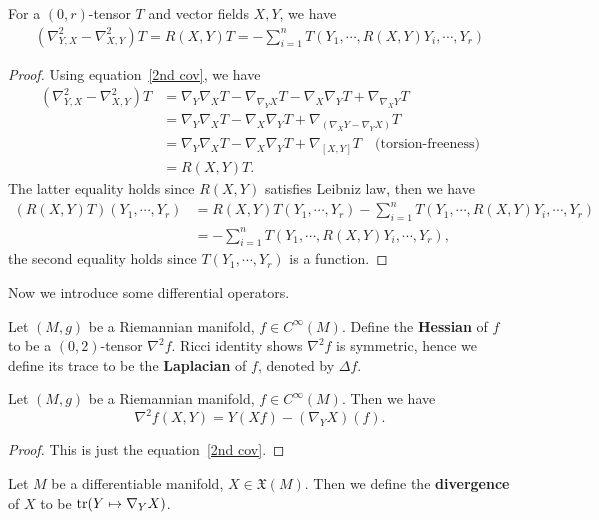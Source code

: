 \begin{prop}\label{Ricci identity}
    For a $(0,r)$-tensor $T$ and vector fields $X,Y$, we have
    \begin{align*}
        (\nabla^2_{Y,X}-\nabla^2_{X,Y})T=R(X,Y)T=-\sum_{i=1}^nT(Y_1,\cdots,R(X,Y)Y_i,\cdots,Y_r)
    \end{align*}
\end{prop}
\begin{proof}
    Using equation~\ref{2nd cov}, we have
    \begin{align*}
        (\nabla^2_{Y,X}-\nabla^2_{X,Y})T&=\nabla_Y\nabla_XT-\nabla_{\nabla_YX}T-\nabla_X\nabla_YT+\nabla_{\nabla_XY}T\\
        &=\nabla_Y\nabla_XT-\nabla_X\nabla_YT+\nabla_{(\nabla_XY-\nabla_YX)}T\\
        &=\nabla_Y\nabla_XT-\nabla_X\nabla_YT+\nabla_{[X,Y]}T\quad\text{(torsion-freeness)}\\
        &=R(X,Y)T.
    \end{align*}
    The latter equality holds since $R(X,Y)$ satisfies Leibniz law, then we have
    \begin{align*}
        (R(X,Y)T)(Y_1,\cdots,Y_r)&=R(X,Y)T(Y_1,\cdots,Y_r)-\sum_{i=1}^nT(Y_1,\cdots,R(X,Y)Y_i,\cdots,Y_r)\\
        &=-\sum_{i=1}^nT(Y_1,\cdots,R(X,Y)Y_i,\cdots,Y_r),
    \end{align*}
    the second equality holds since $T(Y_1,\cdots,Y_r)$ is a function.
\end{proof}

Now we introduce some differential operators.

\begin{defn}
    Let $(M,g)$ be a Riemannian manifold, $f\in C^\infty(M)$.
    Define the \textbf{Hessian} of $f$ to be a $(0,2)$-tensor $\nabla^2f$.
    Ricci identity shows $\nabla^2f$ is symmetric, hence we define its trace to be the \textbf{Laplacian} of $f$, denoted by $\Delta f$.
\end{defn}

\begin{prop}
    Let $(M,g)$ be a Riemannian manifold, $f\in C^\infty(M)$.
    Then we have
    \[\nabla^2f(X,Y)=Y(Xf)-(\nabla_YX)(f).\]
\end{prop}
\begin{proof}
    This is just the equation~\ref{2nd cov}.
\end{proof}

\begin{defn}
    Let $M$ be a differentiable manifold, $X\in\mathfrak{X}(M)$.
    Then we define the \textbf{divergence} of $X$ to be $\operatorname{tr}(Y\mapsto\nabla_YX)$.
\end{defn}